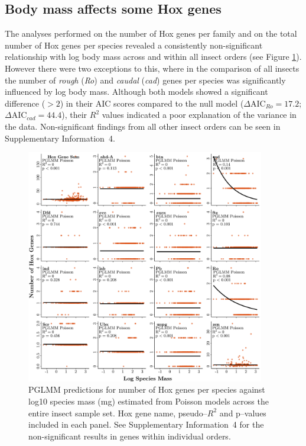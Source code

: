 \documentclass[11pt]{article}
\begin{document}
\subsection{Body mass affects some Hox genes}
\noindent The analyses performed on the number of Hox genes per family and on the total number of Hox genes per species revealed a consistently non-significant relationship with log body mass across and within all insect orders (see Figure \ref{fig:hox_gene_figure}). However there were two exceptions to this, where in the comparison of all insects the number of \textit{rough} (\textit{Ro}) and \textit{caudal} (\textit{cad}) genes per species was significantly influenced by log body mass. Although both models showed a significant difference ($>2$) in their AIC scores compared to the null model ($\Delta\text{AIC}_{Ro} = 17.2$; $\Delta\text{AIC}_{cad} = 44.4$), their $R^2$ values indicated a poor explanation of the variance in the data. Non-significant findings from all other insect orders can be seen in Supplementary Information~4.
\begin{figure}[!b]
    \centering
    \includegraphics[width=0.93\textwidth]{figures/hox_gene_analysis_insecta.pdf}
     \caption{PGLMM predictions for number of Hox genes per species against log10 species mass (mg) estimated from Poisson models across the entire insect sample set. Hox gene name, pseudo--$R^2$ and p--values included in each panel. See Supplementary Information~4 for the non-significant results in genes within individual orders.}
    \label{fig:hox_gene_figure}
\end{figure}
\pagebreak
\end{document}

